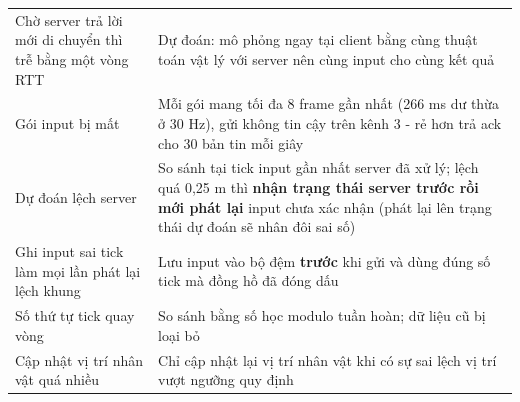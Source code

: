 \begin{center}\small
\begin{tabularx}{\linewidth}{|L{4.4cm}|Y|}
\hline
{} &  \\ \hline
Chờ server trả lời mới di chuyển thì trễ bằng một vòng RTT & Dự đoán: mô phỏng ngay tại client bằng cùng thuật toán vật lý với server nên cùng input cho cùng kết quả \\ \hline
Gói input bị mất & Mỗi gói mang tối đa 8 frame gần nhất (266 ms dư thừa ở 30 Hz), gửi không tin cậy trên kênh 3 - rẻ hơn trả ack cho 30 bản tin mỗi giây \\ \hline
Dự đoán lệch server & So sánh tại tick input gần nhất server đã xử lý; lệch quá 0,25 m thì \textbf{nhận trạng thái server trước rồi mới phát lại} input chưa xác nhận (phát lại lên trạng thái dự đoán sẽ nhân đôi sai số) \\ \hline
Ghi input sai tick làm mọi lần phát lại lệch khung & Lưu input vào bộ đệm \textbf{trước} khi gửi và dùng đúng số tick mà đồng hồ đã đóng dấu \\ \hline
Số thứ tự tick quay vòng & So sánh bằng số học modulo tuần hoàn; dữ liệu cũ bị loại bỏ \\ \hline
Cập nhật vị trí nhân vật quá nhiều & Chỉ cập nhật lại vị trí nhân vật khi có sự sai lệch vị trí vượt ngưỡng quy định \\ \hline
\end{tabularx}
\end{center}

